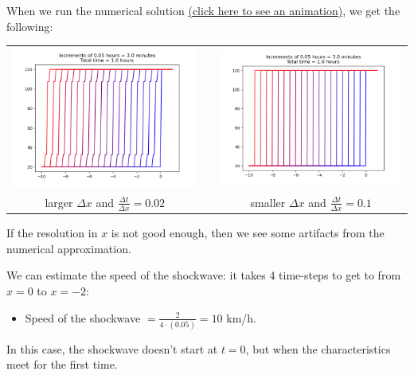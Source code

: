 \documentclass{workbook}
\begin{document}
\begin{solution}
\begin{slide}
\begin{parts}
\setcounter{partsitem}{1}
\item When we run the numerical solution \href{https://raw.githubusercontent.com/bigfatbernie/IBLMathModeling/main/book/images/traffic_flow-60.mp4}{(click here to see an animation)}, we get the following:

\hfil \begin{tabular}{ccc}
\includegraphics[width=.35\textwidth]{images/traffic_flow-60-deltax110.png}
	& \quad	& \includegraphics[width=.35\textwidth]{images/traffic_flow-60-deltax550.png} \\[-8pt]
larger $\Delta x$ and $\frac{\Delta t}{\Delta x} = 0.02$
	& 		& smaller $\Delta x$ and $\frac{\Delta t}{\Delta x} = 0.1$
\end{tabular}

If the resolution in $x$ is not good enough, then we see some artifacts from the numerical approximation.

We can estimate the speed of the shockwave: it takes 4 time-steps to get to from $x=0$ to $x=-2$:
\begin{itemize}
	\item Speed of the shockwave $= \frac{2}{4 \cdot (0.05)} = 10$ km/h.
\end{itemize}


\item In this case, the shockwave doesn't start at $t=0$, but when the characteristics meet for the first time.

\end{parts}
	
\end{slide}
	
\end{solution}
\end{document}
